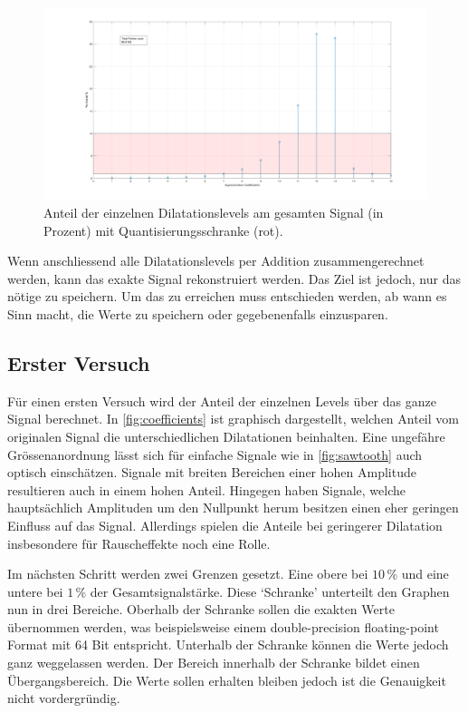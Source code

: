 \begin{refsection}
\begin{figure}
	\centering
	\includegraphics[width=\linewidth]{papers/compress/Bilder/recCoefs}
	\caption{Anteil der einzelnen Dilatationslevels am gesamten Signal (in Prozent) mit Quantisierungsschranke (rot).}
	\label{fig:coefficients}
\end{figure} 

Wenn anschliessend alle Dilatationslevels per Addition zusammengerechnet werden, kann das exakte Signal rekonstruiert werden.
Das Ziel ist jedoch, nur das nötige zu speichern.
Um das zu erreichen muss entschieden werden, ab wann es Sinn macht, die Werte zu speichern oder gegebenenfalls einzusparen.

\subsection{Erster Versuch}
Für einen ersten Versuch wird der Anteil der einzelnen Levels über das ganze Signal berechnet.
In \autoref{fig:coefficients} ist graphisch dargestellt, welchen Anteil vom originalen Signal die unterschiedlichen Dilatationen beinhalten.
Eine ungefähre Grössenanordnung lässt sich für einfache Signale wie in \autoref{fig:sawtooth} auch optisch einschätzen.
Signale mit breiten Bereichen einer hohen Amplitude resultieren auch in einem hohen Anteil. 
Hingegen haben Signale, welche hauptsächlich Amplituden um den Nullpunkt herum besitzen einen eher geringen Einfluss auf das Signal.
Allerdings spielen die Anteile bei geringerer Dilatation insbesondere für Rauscheffekte noch eine Rolle.

Im nächsten Schritt werden zwei Grenzen gesetzt.
Eine obere bei  $10\,\text{\%}$ und eine untere bei $1\,\text{\%}$ der Gesamtsignalstärke.
Diese `Schranke' unterteilt den Graphen nun in drei Bereiche. 
Oberhalb der Schranke sollen die exakten Werte übernommen werden, was beispielsweise einem double-precision floating-point Format mit 64 Bit entspricht.
Unterhalb der Schranke können die Werte jedoch ganz weggelassen werden.
Der Bereich innerhalb der Schranke bildet einen Übergangsbereich.
Die Werte sollen erhalten bleiben jedoch ist die Genauigkeit nicht vordergründig.


\end{refsection}
